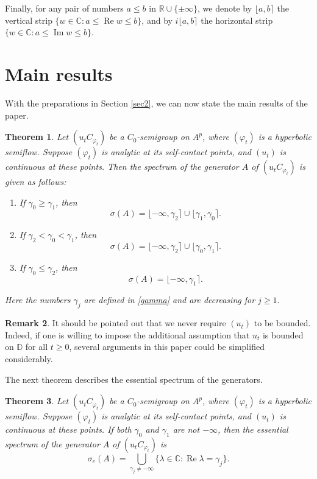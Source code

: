 \documentclass{amsart}
\theoremstyle{proclaim}
\newtheorem{theorem}{Theorem}[section]
\theoremstyle{fancyproclaim}
\theoremstyle{definition}
\newtheorem{remark}[theorem]{Remark}
\theoremstyle{fancystatement}
\numberwithin{equation}{section}
\begin{document}
Finally, for any pair of numbers $a\leq b$ in $\mathbb{R}\cup\{\pm\infty\}$, we denote by $\lfloor a,b\rceil$ the vertical strip $\{w \in\mathbb{C} : a \leq  \operatorname{Re}w\leq b\}$, and by $i\lfloor a,b\rceil$ the horizontal strip $\{w \in\mathbb{C} : a \leq  \operatorname{Im}w\leq b\}$.




\section{Main results}\label{bu}

With the preparations in Section \ref{sec2}, we can now state the main results of the paper.

\begin{theorem}\label{main}
Let $(u_tC_{\varphi_t})$ be a $C_0$-semigroup on $A^p$, where $(\varphi_t)$ is a hyperbolic semiflow. Suppose $(\varphi_t)$ is analytic at its self-contact points, and $(u_t)$ is continuous at these points. Then the spectrum of the generator $A$ of $(u_tC_{\varphi_t})$ is given as follows:
\begin{enumerate}
\item If $\gamma_0 \geq \gamma_1$, then
$$\sigma(A) = \lfloor-\infty, \gamma_2\rceil\cup\lfloor\gamma_1,\gamma_0\rceil.$$

\item If $\gamma_2 < \gamma_0 < \gamma_1$, then
$$\sigma(A) = \lfloor-\infty,  \gamma_2\rceil\cup\lfloor\gamma_0 ,\gamma_1\rceil.$$

\item If $\gamma_0 \leq \gamma_2$, then
$$\sigma(A) = \lfloor-\infty, \gamma_1\rceil.$$
\end{enumerate}
Here the numbers $\gamma_j$ are defined in \eqref{gamma} and are decreasing for $j\geq 1$.
\end{theorem}

\begin{remark}
It should be pointed out that we never require $(u_t)$ to be bounded. Indeed, if one is willing to impose the additional assumption that $u_t$ is bounded on $\mathbb{D}$ for all $t\geq0$, several arguments in this paper could be simplified considerably.
\end{remark}

The next theorem describes the essential spectrum of the generators.

\begin{theorem}\label{ess}
Let $(u_tC_{\varphi_t})$ be a $C_0$-semigroup on $A^p$, where $(\varphi_t)$ is a hyperbolic semiflow. Suppose $(\varphi_t)$ is analytic at its self-contact points, and $(u_t)$ is continuous at these points. If both $\gamma_0$ and $\gamma_1$ are not $-\infty$, then the essential spectrum of the generator $A$ of $(u_tC_{\varphi_t})$ is
$$\sigma_e(A) =\bigcup_{\gamma_j\ne-\infty}\{\lambda\in\mathbb{C} : \operatorname{Re}\lambda=\gamma_j\}.$$
\end{theorem}
\end{document}
